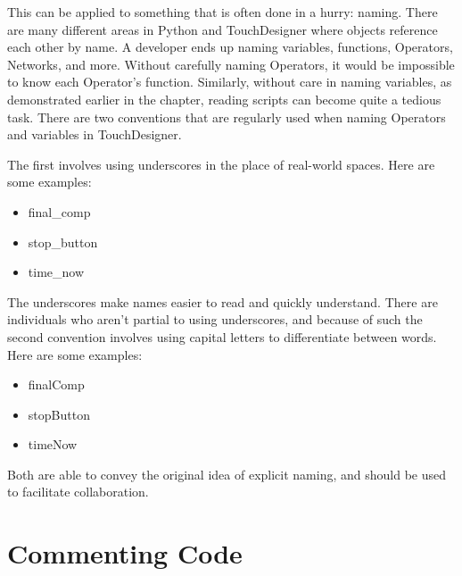 \begin{fullwidth}
This can be applied to something that is often done in a hurry: naming. There are many different areas in Python and TouchDesigner where objects reference each other by name. A developer ends up naming variables, functions, Operators, Networks, and more. Without carefully naming Operators, it would be impossible to know each Operator's function. Similarly, without care in naming variables, as demonstrated earlier in the chapter, reading scripts can become quite a tedious task. There are two conventions that are regularly used when naming Operators and variables in TouchDesigner.

The first involves using underscores in the place of real-world spaces. Here are some examples:

\begin{itemize}
\item final\_comp
\item stop\_button
\item time\_now
\end{itemize}

The underscores make names easier to read and quickly understand. There are individuals who aren't partial to using underscores, and because of such the second convention involves using capital letters to differentiate between words. Here are some examples:

\begin{itemize}
\item finalComp
\item stopButton
\item timeNow
\end{itemize}

Both are able to convey the original idea of explicit naming, and should be used to facilitate collaboration.

\end{fullwidth}


\section{Commenting Code}

